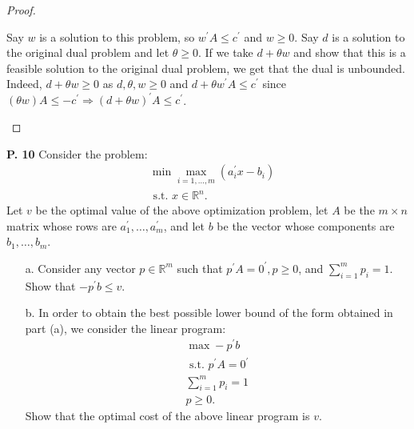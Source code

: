 \documentclass{article}
\begin{document}
\begin{jacklist}
\begin{proof}
\begin{itemize}
                Say $w$ is a solution to this problem, so $w^\prime A \leq c^\prime$ and $w \geq 0$. Say $d$ is a solution 
                to the original dual problem and let $\theta \geq 0$. If we take $d + \theta w$ and show that this is a feasible 
                solution to the original dual problem, we get that the dual is unbounded. Indeed, $d + \theta w \geq 0$ as 
                $d, \theta, w \geq 0$ and $d + \theta w^\prime A \leq c^\prime$ since $(\theta w)A \leq -c^\prime 
                \Rightarrow (d + \theta w)^\prime A \leq c^\prime$.
        \end{itemize} 
    \end{proof}
\newpage
    \begin{framed} 
    \item [\textbf{P. 10}] Consider the problem: 
        \begin{align*}
            & \min \max _{i=1, \ldots, m}\left(a_{i}^{\prime} x-b_{i}\right) \\
            & \text { s.t. } x \in \mathbb{R}^{n} .
        \end{align*} Let $v$ be the optimal value of the above optimization problem, let $A$ be the $m \times n$ matrix whose 
        rows are $a_{1}^{\prime}, \ldots, a_{m}^{\prime}$, and let $b$ be the vector whose components are $b_{1}, \ldots, b_{m}$.
        \begin{itemize}
            \item [a.] Consider any vector $p \in \mathbb{R}^{m}$ such that $p^{\prime} A=0^{\prime}, p \geq 0$, and 
                $\sum_{i=1}^{m} p_{i}=1$. Show that $-p^{\prime} b \leq v$.
            \item [b.] In order to obtain the best possible lower bound of the form obtained in part (a), we consider the linear program:
                \begin{align*}
                    \max -p^{\prime} b \\
                    \text { s.t. } p^{\prime} A=0^{\prime} \\
                    \sum_{i=1}^{m} p_{i}=1 \\
                    p \geq 0.
                \end{align*} 
                Show that the optimal cost of the above linear program is $v$. 
        \end{itemize}
    \end{framed}
\end{jacklist}
\end{document}
